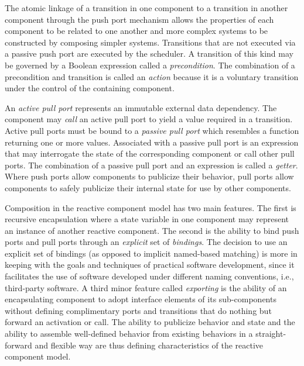 The atomic linkage of a transition in one component to a transition in another component through the push port mechanism allows the properties of each component to be related to one another and more complex systems to be constructed by composing simpler systems.
Transitions that are not executed via a passive push port are executed by the scheduler.
A transition of this kind may be governed by a Boolean expression called a \emph{precondition}.
The combination of a precondition and transition is called an \emph{action} because it is a voluntary transition under the control of the containing component.

An \emph{active pull port} represents an immutable external data dependency.
The component may \emph{call} an active pull port to yield a value required in a transition.
Active pull ports must be bound to a \emph{passive pull port} which resembles a function returning one or more values.
Associated with a passive pull port is an expression that may interrogate the state of the corresponding component or call other pull ports.
The combination of a passive pull port and an expression is called a \emph{getter}.
Where push ports allow components to publicize their behavior, pull ports allow components to safely publicize their internal state for use by other components.

Composition in the reactive component model has two main features.
The first is recursive encapsulation where a state variable in one component may represent an instance of another reactive component.
The second is the ability to bind push ports and pull ports through an \emph{explicit} set of \emph{bindings}.
The decision to use an explicit set of bindings (as opposed to implicit named-based matching) is more in keeping with the goals and techniques of practical software development, since it facilitates the use of software developed under different naming conventions, i.e., third-party software.
A third minor feature called \emph{exporting} is the ability of an encapsulating component to adopt interface elements of its sub-components without defining complimentary ports and transitions that do nothing but forward an activation or call.
The ability to publicize behavior and state and the ability to assemble well-defined behavior from existing behaviors in a straight-forward and flexible way are thus defining characteristics of the reactive component model.


